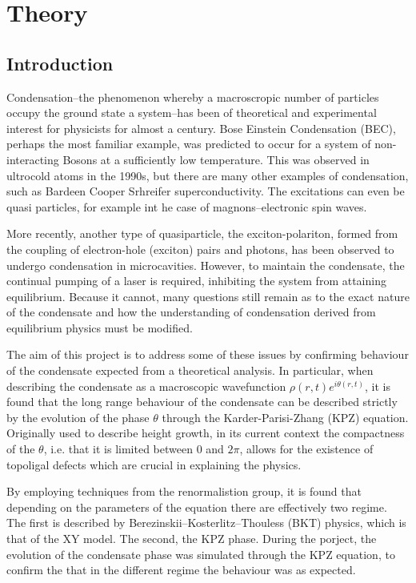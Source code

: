 \chapter{Theory}
\section{Introduction}

Condensation--the phenomenon whereby a macroscropic number of particles occupy the ground state a system--has been of theoretical and experimental interest for physicists for almost a century. Bose Einstein Condensation (BEC), perhaps the most familiar example, was predicted to occur for a system of non-interacting Bosons at a sufficiently low temperature. This was observed in ultrocold atoms in the 1990s, but there are many other examples of condensation, such as Bardeen Cooper Srhreifer superconductivity. The excitations can even be quasi particles, for example int he case of magnons--electronic spin waves.

More recently, another type of quasiparticle, the exciton-polariton, formed from the coupling of electron-hole (exciton) pairs and photons, has been observed to undergo condensation in microcavities. However, to maintain the condensate, the continual pumping of a laser is required, inhibiting the system from attaining equilibrium. Because it cannot, many questions still remain as to the exact nature of the condensate and how the understanding of condensation derived from equilibrium physics must be modified. 

The aim of this project is to address some of these issues by confirming behaviour of the condensate expected from a theoretical analysis. In particular, when describing the condensate as a macroscopic wavefunction $\rho(r,t)e^{i\theta(r,t)}$, it is found that the long range behaviour of the condensate can be described strictly by the evolution of the phase $\theta$ through the Karder-Parisi-Zhang (KPZ) equation. Originally used to describe height growth, in its current context the compactness of the $\theta$, i.e. that it is limited between $0$ and $2\pi$, allows for the existence of topoligal defects which are crucial in explaining the physics.

By employing techniques from the renormalistion group, it is found that depending on the parameters of the equation there are effectively two regime. The first is described by Berezinskii–Kosterlitz–Thouless (BKT) physics, which is that of the XY model. The second, the KPZ phase. 
During the porject, the evolution of the condensate phase was simulated through the KPZ equation, to confirm the that in the different regime the behaviour was as expected. 


